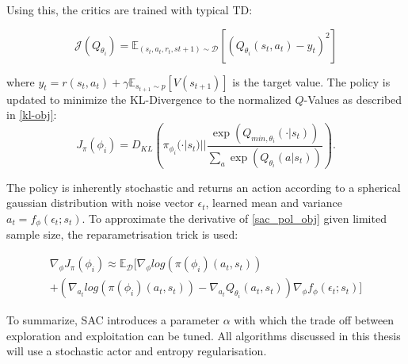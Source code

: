 Using this, the critics are trained with typical TD:

\begin{equation}
    \mathcal{J}(Q_{\theta_i}) = \mathbb{E}_{(s_t, a_t, r_t, s{t+1}) \sim \mathcal{D}}[(Q_{\theta_i}(s_t,a_t) - y_t)^2]
\end{equation}

where $y_t = r(s_t, a_t) + \gamma \mathbb{E}_{s_{t+1} \sim p}[V(s_{t+1})]$ is the target value. The policy is updated to minimize the KL-Divergence to the normalized $Q$-Values as described in \ref{kl-obj}:
\begin{equation}
    \label{sac_pol_obj}
    J_\pi(\phi_{i}) = D_{KL} \left( \pi_{\phi_{i}}(\cdot|s_t) || \frac{\exp(Q_{min, {\theta_i}}(\cdot|s_t))}{\underset{a}{\sum}  \exp(Q_{\theta_i}(a|s_t))} \right).
\end{equation}

The policy is inherently stochastic and returns an action according to a spherical gaussian distribution with noise vector $\epsilon_t$, learned mean and variance $a_t = f_{\phi}(\epsilon_t;s_t)$. 
To approximate the derivative of \ref{sac_pol_obj} given limited sample size, the reparametrisation trick is used:

\begin{equation}
    \begin{align}
        \nabla_{\phi}J_\pi(\phi_{i}) \approx \mathbb{E}_{\mathcal{D}} [\nabla_{\phi} log (\pi(\phi_{i})(a_t, s_t))\\
        + \left( \nabla_{a_t} log (\pi(\phi_{i})(a_t, s_t)) - \nabla_{a_t} Q_{\theta_i}(a_t, s_t) \right) \nabla_{\phi} f_{\phi}(\epsilon_t;s_t)]
    \end{align}
\end{equation}

To summarize, SAC introduces a parameter $\alpha$ with which the trade off between exploration and exploitation can be tuned. All algorithms discussed in this thesis will use a stochastic 
actor and entropy regularisation.
